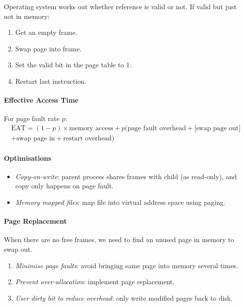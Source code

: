 \documentclass[twocolumn,english]{article}
\begin{document}
Operating system works out whether reference is valid or not. If valid
but just not in memory:
\begin{enumerate}
\item Get an empty frame.
\item Swap page into frame.
\item Set the valid bit in the page table to 1.
\item Restart last instruction.
\end{enumerate}

\paragraph{Effective Access Time}

For page fault rate $p$:
\begin{multline*}
\text{EAT}=\left(1-p\right)\times\text{memory access}+p(\text{page fault overhead}+\text{[swap page out]}\\
+\text{swap page in}+\text{restart overhead})
\end{multline*}

\paragraph{Optimisations}
\begin{itemize}
\item \emph{Copy-on-write}: parent process shares frames with child (as
read-only), and copy only happens on page fault.
\item \emph{Memory mapped files}: map file into virtual address space using
paging.
\end{itemize}

\paragraph{Page Replacement}

When there are no free frames, we need to find an unused page in memory
to swap out.
\begin{enumerate}
\item \emph{Minimise page faults}: avoid bringing same page into memory
several times.
\item \emph{Prevent over-allocation}: implement page replacement.
\item \emph{User dirty bit to reduce overhead}: only write modified pages
back to disk.
\end{enumerate}
\end{document}
